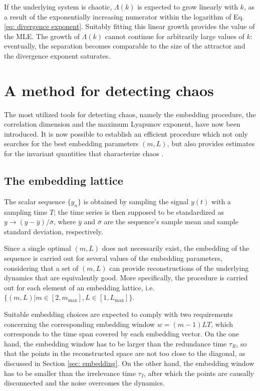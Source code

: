 If the underlying system is chaotic, $\Lambda(k)$ is expected to grow linearly with $k$,
as a result of the exponentially increasing numerator within the logarithm of Eq. \ref{eq: divergence exponent}.
Suitably fitting this linear growth provides the value of the MLE.
The growth of $\Lambda(k)$ cannot continue for arbitrarily large values of $k$:
eventually, the separation becomes comparable to the size of the attractor
and the divergence exponent saturates.


\section{A method for detecting chaos}
\label{sec: method for chaos}

The most utilized tools for detecting chaos, namely the embedding procedure, the correlation dimension
and the maximum Lyapunov exponent, have now been introduced.
It is now possible to establish an efficient procedure which not only searches for the best
embedding parameters $(m,L)$, but also provides estimates for the invariant quantities that
characterize chaos \cite{ref:perinelli2020chasing}.

\subsection{The embedding lattice}
\label{subsec: embedding lattice}

The scalar sequence $\{y_n\}$ is obtained by sampling the signal $y(t)$ with a sampling time $T$;
the time series is then supposed to be standardized as
$y \rightarrow (y - \bar{y})/\bar{\sigma}$, where $\bar{y}$ and $\bar{\sigma}$ are the sequence's
sample mean and sample standard deviation, respectively.

Since a single optimal $(m,L)$ does
not necessarily exist, the embedding of the sequence is carried out for several values of the
embedding parameters, considering that a set of
$(m, L)$ can provide reconstructions of the underlying dynamics that are equivalently good.
More specifically, the procedure is carried out for each element of an embedding lattice, i.e.
$\{(m,L)|m\in[2,m_{\max}],L\in[1,L_{\max}]\}$.

Suitable embedding choices are expected to comply with two requirements concerning the
corresponding embedding window $w=(m-1)LT$, which corresponds to the
time span covered by each embedding vector.
On the one hand, the embedding window has to be larger than the redundance time $\tau_R$, so that
the points in the reconstructed space are not too close to the diagonal, as discussed in Section
\ref{sec: embedding}. On the other hand, the embedding window has to be
smaller than the irrelevance time $\tau_I$, after which the points are causally disconnected
and the noise overcomes the dynamics.

